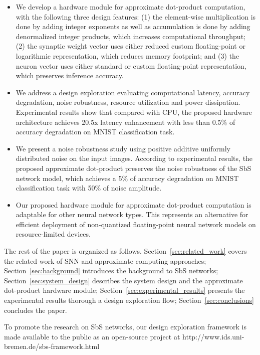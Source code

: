 \begin{itemize}
	\item We develop a hardware module for approximate dot-product computation, with the following three design features: (1) the element-wise multiplication is done by adding integer exponents as well as accumulation is done by adding denormalized integer products, which increases computational throughput; (2) the synaptic weight vector uses either reduced custom floating-point or logarithmic representation, which reduces memory footprint; and (3) the neuron vector uses either standard or custom floating-point representation, which preserves inference accuracy.
	\item We address a design exploration evaluating computational latency, accuracy degradation, noise robustness, resource utilization and power dissipation. Experimental results show that compared with CPU, the proposed hardware architecture achieves 20.5x latency enhancement with less than 0.5\% of accuracy degradation on MNIST classification task.
	\item We present a noise robustness study using positive additive uniformly distributed noise on the input images. According to experimental results, the proposed approximate dot-product preserves the noise robustness of the SbS network model, which achieves a 5\% of accuracy degradation on MNIST classification task with 50\% of noise amplitude.
	\item Our proposed hardware module for approximate dot-product computation is adaptable for other neural network types. This represents an alternative for efficient deployment of non-quantized floating-point neural network models on resource-limited devices.
\end{itemize}


The rest of the paper is organized as follows. Section~\ref{sec:related_work} covers the related work of SNN and approximate computing approaches; Section~\ref{sec:background} introduces the background to SbS networks; Section~\ref{sec:system_design} describes the system design and the approximate dot-product hardware module; Section~\ref{sec:experimental_results} presents the experimental results thorough a design exploration flow; Section~\ref{sec:conclusions} concludes the paper.


To promote the research on SbS networks, our design exploration framework is made available to the public as an open-source project at http://www.ids.uni-bremen.de/sbs-framework.html

